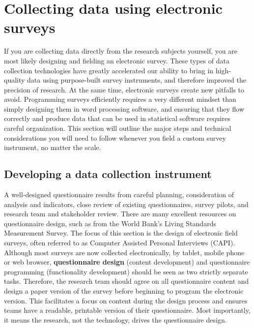 \section{Collecting data using electronic surveys}

If you are collecting data directly from the research subjects yourself,
you are most likely designing and fielding an electronic survey.
These types of data collection technologies
have greatly accelerated our ability to bring in high-quality data
using purpose-built survey instruments,
and therefore improved the precision of research.
At the same time, electronic surveys create new pitfalls to avoid.
Programming surveys efficiently requires a very different mindset
than simply designing them in word processing software,
and ensuring that they flow correctly and produce data
that can be used in statistical software requires careful organization.
This section will outline the major steps and technical considerations
you will need to follow whenever you field a custom survey instrument,
no matter the scale.

\subsection{Developing a data collection instrument}

A well-designed questionnaire results from careful planning,
consideration of analysis and indicators, close review of existing questionnaires,
survey pilots, and research team and stakeholder review.
There are many excellent resources on questionnaire design,
such as from the World Bank's Living Standards Measurement Survey.\cite{glewwe2000designing}
The focus of this section is the design of electronic field surveys,
often referred to as Computer Assisted Personal Interviews (CAPI).
Although most surveys are now collected electronically, by tablet, mobile phone or web browser,
\textbf{questionnaire design}
(content development) and questionnaire programming (functionality development)
should be seen as two strictly separate tasks.
Therefore, the research team should agree on all questionnaire content
and design a paper version of the survey before beginning to program the electronic version.
This facilitates a focus on content during the design process
and ensures teams have a readable, printable version of their questionnaire.
Most importantly, it means the research, not the technology, drives the questionnaire design.

